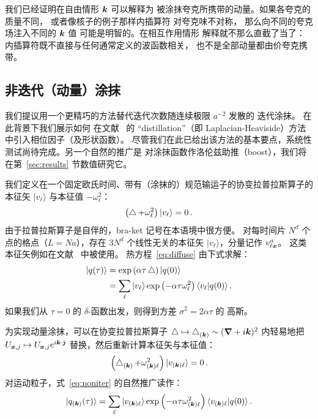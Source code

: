 我们已经证明在自由情形 $\boldsymbol{k}$ 可以解释为
被涂抹夸克所携带的动量。如果各夸克的质量不同，
或者像核子的例子那样内插算符
对夸克味不对称，
那么向不同的夸克场注入不同的 $\boldsymbol{k}$ 值
可能是明智的。在相互作用情形
解释就不那么直截了当了：
内插算符既不直接与任何通常定义的波函数相关，
也不是全部动量都由价夸克携带。

\subsection{非迭代（动量）涂抹}
\label{sec:improve}
我们提议用一个更精巧的方法替代迭代次数随连续极限 $a^{-2}$ 发散的
迭代涂抹。
在此背景下我们展示如何
在文献~\cite{Peardon:2009gh} 的 ``distillation''（即 Laplacian-Heaviside）方法中引入相位因子（及形状函数）。
尽管我们在此已给出该方法的基本要点，系统性
测试尚待完成。另一个自然的推广是
对涂抹函数作洛伦兹助推（boost），我们将
在第~\ref{sec:results} 节数值研究它。

我们定义在一个固定欧氏时间、带有（涂抹的）规范输运子的协变拉普拉斯算子的本征矢 $|v_{\ell}\rangle$ 与本征值 $-\omega_{\ell}^2$：
\begin{equation}
\label{eq:eigen}
\left(\mathop{{}\bigtriangleup}\nolimits +\omega_\ell^2\right)|v_{\ell}\rangle=0\,.
\end{equation}
由于拉普拉斯算子是自伴的，bra-ket 记号在本语境中很方便。
对每时间片 $N^d$ 个点的格点（$L=Na$），存在
$3N^d$ 个线性无关的本征矢 $|v_{\ell}\rangle$，分量记作 $v^{a}_{\ell\boldsymbol{x}}$。
这类本征矢例如在文献~\cite{Peardon:2009gh} 中被使用。
热方程~\eqref{eq:diffuse} 由下式求解：
\begin{align}
|q(\tau)\rangle&=\exp\left(\alpha\tau\mathop{{}\bigtriangleup}\nolimits\right)|q(0)\rangle\nonumber\\
&=\sum_{\ell}| v_{\ell}\rangle\exp\left(-\alpha\tau\omega_{\ell}^2\right)\langle v_{\ell}|q(0)\rangle
\,.\label{eq:noniter}
\end{align}
如果我们从 $\tau=0$ 的 $\delta$-函数出发，则得到方差 $\sigma^2=2\alpha\tau$ 的
高斯。

为实现动量涂抹，可以在协变拉普拉斯算子 $\mathop{{}\bigtriangleup}\nolimits\mapsto\mathop{{}\bigtriangleup}\nolimits_{(\boldsymbol{k})}\sim
(\boldsymbol{\nabla}+i\boldsymbol{k})^2$ 内轻易地把
$U_{\boldsymbol{x},j}\mapsto U_{\boldsymbol{x},j}e^{i\boldsymbol{k}\cdot\hat{\boldsymbol{\jmath}}}$
替换，然后重新计算本征矢与本征值：
\begin{equation}
\label{eq:eigen2}
\left(\mathop{{}\bigtriangleup}\nolimits_{(\boldsymbol{k})} +\omega_{(\boldsymbol{k})\ell}^2\right)|v_{(\boldsymbol{k})\ell}\rangle=0\,.
\end{equation}
对运动粒子，式~\eqref{eq:noniter} 的自然推广读作：
\begin{equation}
|q_{(\boldsymbol{k})}(\tau)\rangle
=\sum_{\ell}| v_{(\boldsymbol{k})\ell}\rangle\exp\left(-\alpha\tau\omega_{(\boldsymbol{k})\ell}^2\right)\langle v_{(\boldsymbol{k})\ell}|q(0)\rangle
\,.
\label{eq:noniter2}
\end{equation}

